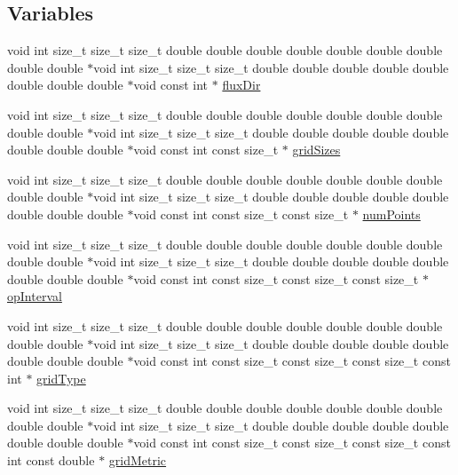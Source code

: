\subsection*{Variables}
\begin{DoxyCompactItemize}
\item 
void int size\+\_\+t size\+\_\+t size\+\_\+t double double double double double double double double double $\ast$void int size\+\_\+t size\+\_\+t size\+\_\+t double double double double double double double double $\ast$void const int $\ast$ \hyperlink{ViscidKernels_8H_a466b72ae195460a9c9f2d36373803dc5}{flux\+Dir}
\item 
void int size\+\_\+t size\+\_\+t size\+\_\+t double double double double double double double double double $\ast$void int size\+\_\+t size\+\_\+t size\+\_\+t double double double double double double double double $\ast$void const int const size\+\_\+t $\ast$ \hyperlink{ViscidKernels_8H_a969a5d6106eec8b7096250b27865b9ba}{grid\+Sizes}
\item 
void int size\+\_\+t size\+\_\+t size\+\_\+t double double double double double double double double double $\ast$void int size\+\_\+t size\+\_\+t size\+\_\+t double double double double double double double double $\ast$void const int const size\+\_\+t const size\+\_\+t $\ast$ \hyperlink{ViscidKernels_8H_adf0bf75d0875d1bb42a5348bee7b7bfd}{num\+Points}
\item 
void int size\+\_\+t size\+\_\+t size\+\_\+t double double double double double double double double double $\ast$void int size\+\_\+t size\+\_\+t size\+\_\+t double double double double double double double double $\ast$void const int const size\+\_\+t const size\+\_\+t const size\+\_\+t $\ast$ \hyperlink{ViscidKernels_8H_afdddc7f5e59ff0ec8fb420fa2c1091ef}{op\+Interval}
\item 
void int size\+\_\+t size\+\_\+t size\+\_\+t double double double double double double double double double $\ast$void int size\+\_\+t size\+\_\+t size\+\_\+t double double double double double double double double $\ast$void const int const size\+\_\+t const size\+\_\+t const size\+\_\+t const int $\ast$ \hyperlink{ViscidKernels_8H_a7a50f58330cd920f95a842271848006b}{grid\+Type}
\item 
void int size\+\_\+t size\+\_\+t size\+\_\+t double double double double double double double double double $\ast$void int size\+\_\+t size\+\_\+t size\+\_\+t double double double double double double double double $\ast$void const int const size\+\_\+t const size\+\_\+t const size\+\_\+t const int const double $\ast$ \hyperlink{ViscidKernels_8H_a40f73d0f458f6398fb217316165896c1}{grid\+Metric}

\end{DoxyCompactItemize}
